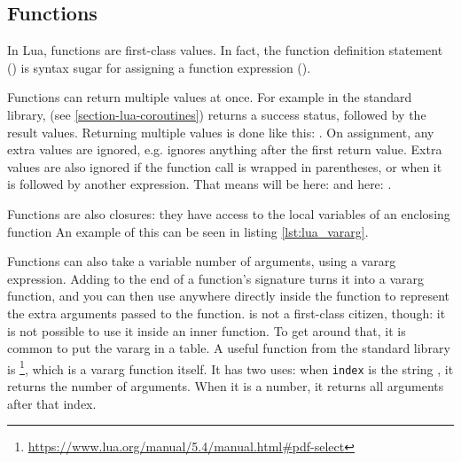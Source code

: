 \newpage
\subsection{Functions}
In Lua, functions are first-class values. In fact, the function definition statement () is syntax sugar for assigning a function expression ().

Functions can return multiple values at once. For example in the standard library,  (see \ref{section-lua-coroutines}) returns a success status, followed by the result values. Returning multiple values is done like this: . On assignment, any extra values are ignored, e.g.  ignores anything after the first return value. Extra values are also ignored if the function call is wrapped in parentheses, or when it is followed by another expression. That means  will be  here:  and here: .

Functions are also closures: they have access to the local variables of an enclosing function An example of this can be seen in listing \ref{lst:lua_vararg}.

Functions can also take a variable number of arguments, using a vararg expression. Adding  to the end of a function's signature turns it into a vararg function, and you can then use  anywhere directly inside the function to represent the extra arguments passed to the function.  is not a first-class citizen, though: it is not possible to use it inside an inner function. To get around that, it is common to put the vararg in a table. A useful function from the standard library is \footnote{\url{https://www.lua.org/manual/5.4/manual.html#pdf-select}}, which is a vararg function itself. It has two uses: when \texttt{index} is the string , it returns the number of arguments. When it is a number, it returns all arguments after that index.

